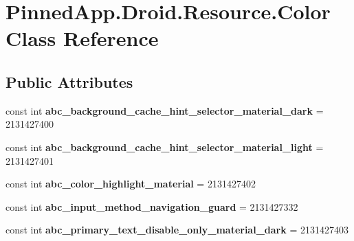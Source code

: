 \hypertarget{class_pinned_app_1_1_droid_1_1_resource_1_1_color}{}\section{Pinned\+App.\+Droid.\+Resource.\+Color Class Reference}
\label{class_pinned_app_1_1_droid_1_1_resource_1_1_color}
\subsection*{Public Attributes}
\begin{DoxyCompactItemize}
\item 
\mbox{\label{class_pinned_app_1_1_droid_1_1_resource_1_1_color_a5a5be4db15b83534b2536ffe604d1b3d}} 
const int {\bfseries abc\+\_\+background\+\_\+cache\+\_\+hint\+\_\+selector\+\_\+material\+\_\+dark} = 2131427400
\item 
\mbox{\label{class_pinned_app_1_1_droid_1_1_resource_1_1_color_a7d299e1d58ada4cf3ab72ff6fdd7c483}} 
const int {\bfseries abc\+\_\+background\+\_\+cache\+\_\+hint\+\_\+selector\+\_\+material\+\_\+light} = 2131427401
\item 
\mbox{\label{class_pinned_app_1_1_droid_1_1_resource_1_1_color_a7f0d7b26079d306666c142724a6d2ef0}} 
const int {\bfseries abc\+\_\+color\+\_\+highlight\+\_\+material} = 2131427402
\item 
\mbox{\label{class_pinned_app_1_1_droid_1_1_resource_1_1_color_a45ac857fb78ac5ce0b0f68465bd85514}} 
const int {\bfseries abc\+\_\+input\+\_\+method\+\_\+navigation\+\_\+guard} = 2131427332
\item 
\mbox{\label{class_pinned_app_1_1_droid_1_1_resource_1_1_color_a2fa78054f9474682267b993a3c2d857d}} 
const int {\bfseries abc\+\_\+primary\+\_\+text\+\_\+disable\+\_\+only\+\_\+material\+\_\+dark} = 2131427403
\item 
\mbox{\label{class_pinned_app_1_1_droid_1_1_resource_1_1_color_a2daed7265940f56ac51396bb599b11a4}} 

\end{DoxyCompactItemize}
